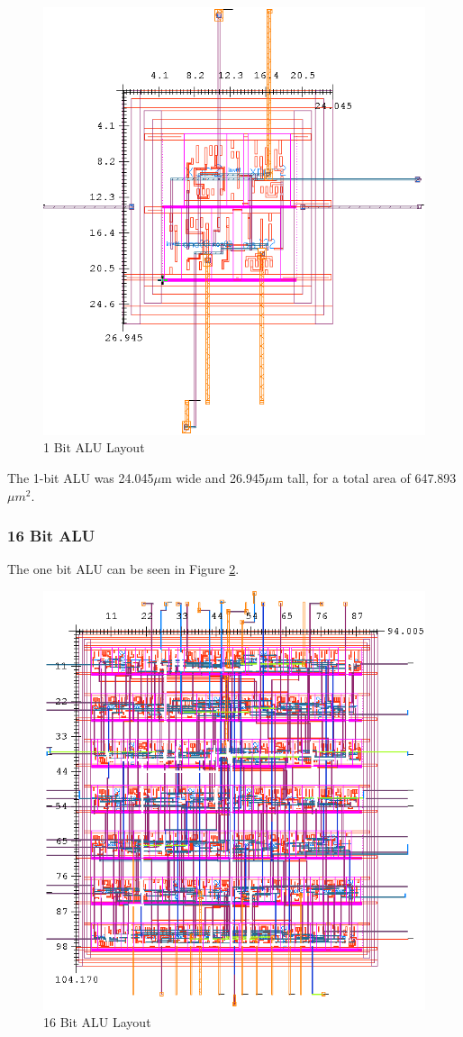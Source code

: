 \documentclass[11pt]{article}
\begin{document}
			\begin{figure}[H]
				\centering
				\includegraphics[width=0.7\linewidth]{"Pictures/ALU 1-Bit Layout"}
				\caption{1 Bit ALU Layout}
				\label{fig:alu-1bit-layout}
			\end{figure}
			
			The 1-bit ALU was 24.045$\mu$m wide and 26.945$\mu$m tall, for a total area of 647.893$\mu m^2$.
	
		\subsubsection{16 Bit ALU}
		
			The one bit ALU can be seen in Figure \ref{fig:alu-16bit-layout}.
		
			\begin{figure}[H]
				\centering
				\includegraphics[width=0.7\linewidth]{"Pictures/ALU 16-Bit Layout"}
				\caption{16 Bit ALU Layout}
				\label{fig:alu-16bit-layout}
			\end{figure}
		
\end{document}
